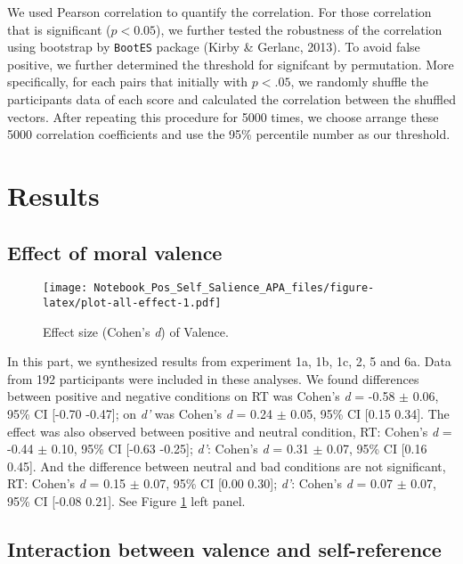 \documentclass[
  english,
  man]{apa6}
\begin{document}
We used Pearson correlation to quantify the correlation. For those correlation that is significant (\(p < 0.05\)), we further tested the robustness of the correlation using bootstrap by \texttt{BootES} package (Kirby \& Gerlanc, 2013). To avoid false positive, we further determined the threshold for signifcant by permutation. More specifically, for each pairs that initially with \(p < .05\), we randomly shuffle the participants data of each score and calculated the correlation between the shuffled vectors. After repeating this procedure for 5000 times, we choose arrange these 5000 correlation coefficients and use the 95\% percentile number as our threshold.

\hypertarget{results}{%
\section{Results}\label{results}}

\hypertarget{effect-of-moral-valence}{%
\subsection{Effect of moral valence}\label{effect-of-moral-valence}}

\begin{figure}
\centering
\texttt{[image: Notebook\_Pos\_Self\_Salience\_APA\_files/figure-latex/plot-all-effect-1.pdf]}
\caption{\label{fig:plot-all-effect}Effect size (Cohen's \emph{d}) of Valence.}
\end{figure}

In this part, we synthesized results from experiment 1a, 1b, 1c, 2, 5 and 6a. Data from 192 participants were included in these analyses. We found differences between positive and negative conditions on RT was Cohen's \emph{d} = -0.58 \(\pm\) 0.06, 95\% CI {[}-0.70 -0.47{]}; on \emph{d'} was Cohen's \emph{d} = 0.24 \(\pm\) 0.05, 95\% CI {[}0.15 0.34{]}. The effect was also observed between positive and neutral condition, RT: Cohen's \emph{d} = -0.44 \(\pm\) 0.10, 95\% CI {[}-0.63 -0.25{]}; \emph{d'}: Cohen's \emph{d} = 0.31 \(\pm\) 0.07, 95\% CI {[}0.16 0.45{]}. And the difference between neutral and bad conditions are not significant, RT: Cohen's \emph{d} = 0.15 \(\pm\) 0.07, 95\% CI {[}0.00 0.30{]}; \emph{d'}: Cohen's \emph{d} = 0.07 \(\pm\) 0.07, 95\% CI {[}-0.08 0.21{]}. See Figure \ref{fig:plot-all-effect} left panel.

\hypertarget{interaction-between-valence-and-self-reference}{%
\subsection{Interaction between valence and self-reference}\label{interaction-between-valence-and-self-reference}}
\end{document}

